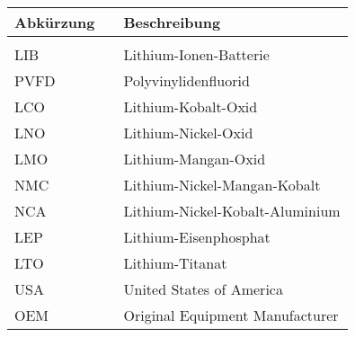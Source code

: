 \vspace{1cm}
\\
\hspace*{0.8cm}
\begin{tabularx}{15.1cm}{lll}
	\textbf{Abkürzung} & \hspace{1.95cm} & \textbf{Beschreibung} \\ %
	\hline \\ [-0.2cm]
	LIB & & Lithium-Ionen-Batterie\\ [0.1cm]
	PVFD & & Polyvinylidenfluorid\\ [0.1cm]
	LCO & & Lithium-Kobalt-Oxid\\ [0.1cm]
	LNO & & Lithium-Nickel-Oxid\\ [0.1cm]
	LMO & & Lithium-Mangan-Oxid\\ [0.1cm]
	NMC & & Lithium-Nickel-Mangan-Kobalt\\ [0.1cm]
	NCA & & Lithium-Nickel-Kobalt-Aluminium\\ [0.1cm]
	LEP & & Lithium-Eisenphosphat\\ [0.1cm]
	LTO & & Lithium-Titanat\\ [0.1cm]
	USA & & United States of America\\ [0.1cm]
	OEM & & Original Equipment Manufacturer\\ [0.1cm]
	
\end{tabularx}




